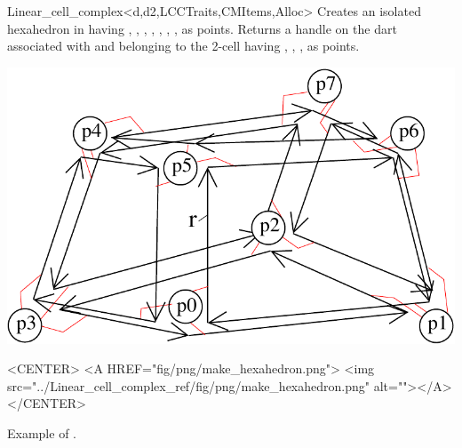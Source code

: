 \begin{ccRefClass}{Linear_cell_complex<d,d2,LCCTraits,CMItems,Alloc>}
{Creates an isolated hexahedron in  having , ,
, , , , ,  as points.
  Returns a handle on the dart associated with  and
  belonging to the 2-cell having , , , 
  as points.
}
\def\LargFig{.4\textwidth}
  \begin{ccTexOnly}
    \begin{center}
      \includegraphics[width=\LargFig]{Linear_cell_complex_ref/fig/pdf/make_hexahedron}
    \end{center}
  \end{ccTexOnly}
  \begin{ccHtmlOnly}
    <CENTER>
    <A HREF="fig/png/make_hexahedron.png">
        <img src="../Linear_cell_complex_ref/fig/png/make_hexahedron.png" alt=""></A>
    </CENTER>
    \end{ccHtmlOnly}
    \centerline{Example of .}

\ccSeeAlso
{}\\
\\
\\
\\
\\
\\

\end{ccRefClass}
\ccRefPageEnd
